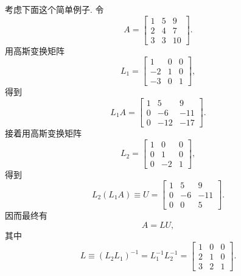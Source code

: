 考虑下面这个简单例子. 令
\[
  A=
  \begin{bmatrix}
    1 & 5 & 9 \\
    2 & 4 & 7 \\
    3 & 3 & 10
  \end{bmatrix}.
\]
用高斯变换矩阵
\[
  L_1=
  \begin{bmatrix}
    1  & 0 & 0 \\
    -2 & 1 & 0 \\
    -3 & 0 & 1
  \end{bmatrix},
\]
得到
\[
  L_1A=
  \begin{bmatrix}
    1 & 5  & 9  \\
    0 & -6 & -11\\
    0 & -12& -17
  \end{bmatrix}.
\]
接着用高斯变换矩阵
\[
  L_2=
  \begin{bmatrix}
    1 & 0  & 0 \\
    0 & 1  & 0 \\
    0 & -2 & 1
  \end{bmatrix},
\]
得到
\[
  L_2(L_1A)\equiv U=
  \begin{bmatrix}
    1 & 5  & 9  \\
    0 & -6 & -11\\
    0 & 0  & 5
  \end{bmatrix}.
\]
因而最终有
\[
  A=LU,
\]
其中
\[
  L\equiv(L_2L_1)^{-1}=L_1^{-1}L_2^{-1}=
  \begin{bmatrix}
    1 & 0 & 0 \\
    2 & 1 & 0 \\
    3 & 2 & 1
  \end{bmatrix}.
\]


